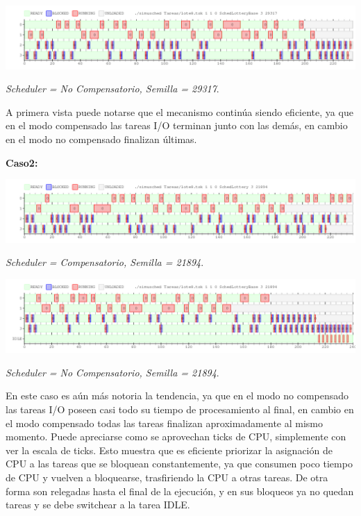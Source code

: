 \includegraphics[width=1\textwidth]{./Graficos/Ej10v2/Task8/ej9_3_base.png}
\begin{center}
 \textit{Scheduler = No Compensatorio, Semilla = 29317}.
\end{center}

\vspace{2mm}

A primera vista puede notarse que el mecanismo contin\'ua siendo eficiente, ya que en el modo compensado las tareas I/O terminan junto con las dem\'as, en cambio en el modo no compensado finalizan \'ultimas.
\vspace{2mm}

\textbf{Caso2:}

\vspace{2mm}

\includegraphics[width=1\textwidth]{./Graficos/Ej10v2/Task8/ej9_4.png}
\begin{center}
 \textit{Scheduler = Compensatorio, Semilla = 21894}.
\end{center}


\includegraphics[width=1\textwidth]{./Graficos/Ej10v2/Task8/ej9_4_base.png}
\begin{center}
 \textit{Scheduler = No Compensatorio, Semilla = 21894}.
\end{center}

\vspace{2mm}


En este caso es a\'un m\'as notoria la tendencia, ya que en el modo no compensado las tareas I/O poseen casi todo su tiempo de procesamiento al final, en cambio en el modo compensado todas las tareas finalizan aproximadamente al mismo momento. Puede apreciarse como se aprovechan ticks de CPU, simplemente con ver la escala de ticks. Esto muestra que es eficiente priorizar la asignaci\'on de CPU a las tareas que se bloquean constantemente, ya que consumen poco tiempo de CPU y vuelven a bloquearse, trasfiriendo la CPU a otras tareas. De otra forma son relegadas hasta el final de la ejecuci\'on, y en sus bloqueos ya no quedan tareas y se debe switchear a la tarea IDLE.

